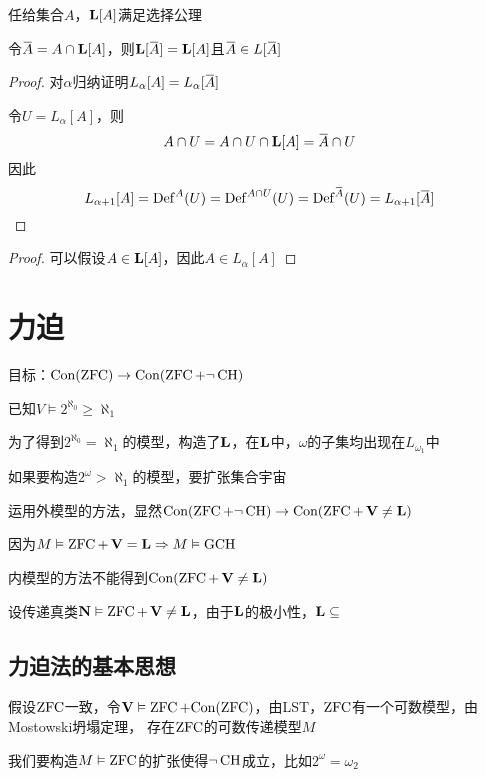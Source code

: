 \documentclass[11pt]{article}
\begin{document}
\begin{exercise}[8.4.12]
任给集合\(A\)，\(\bL[A]\)满足选择公理
\end{exercise}

\begin{lemma}[]
令\(\barA=A\cap\bL[A]\)，则\(\bL[\barA]=\bL[A]\)且\(\barA\in L[\barA]\)
\end{lemma}

\begin{proof}
对\(\alpha\)归纳证明\(L_\alpha[A]=L_\alpha[\barA]\)

令\(U=L_\alpha[A]\)，则
\begin{equation*}
A\cap U=A\cap U\cap\bL[A]=\barA\cap U
\end{equation*}
因此
\begin{equation*}
L_{\alpha+1}[A]=\Def^A(U)=\Def^{A\cap U}(U)=\Def^{\barA}(U)=L_{\alpha+1}[\barA]
\end{equation*}
\end{proof}

\begin{proof}
可以假设\(A\in\bL[A]\)，因此\(A\in L_\alpha[A]\)
\end{proof}
\section{力迫}
\label{sec:org077fea1}
目标：\(\Con(\ZFC)\to\Con(\ZFC+\neg\CH)\)

已知\(V\vDash 2^{\aleph_0}\ge\aleph_1\)

为了得到\(2^{\aleph_0}=\aleph_1\)的模型，构造了\(\bL\)，在\(\bL\)中，\(\omega\)的子集均出现在\(L_{\omega_1}\)中

如果要构造\(2^\omega>\aleph_1\)的模型，要扩张集合宇宙

运用外模型的方法，显然\(\Con(\ZFC+\neg\CH)\to\Con(\ZFC+\bV\neq\bL)\)

因为\(M\vDash\ZFC+\bV=\bL\Rightarrow M\vDash\GCH\)

内模型的方法不能得到\(\Con(\ZFC+\bV\neq\bL)\)

设传递真类\(\bN\vDash\ZFC+\bV\neq\bL\)，由于\(\bL\)的极小性，\(\bL\subseteq\)
\subsection{力迫法的基本思想}
\label{sec:org3114e45}
假设\(\ZFC\)一致，令\(\bV\vDash\ZFC+\Con(\ZFC)\)，由LST，\(\ZFC\)有一个可数模型，由Mostowski坍塌定理，
存在\(\ZFC\)的可数传递模型\(M\)

我们要构造\(M\vDash\ZFC\)的扩张使得\(\neg\CH\)成立，比如\(2^\omega=\omega_2\)
\end{document}
